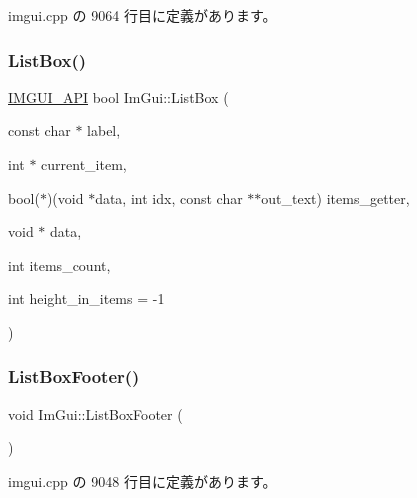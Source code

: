  imgui.\+cpp の 9064 行目に定義があります。

\mbox{\label{namespace_im_gui_ab5865b671bfa22738fac9ffd214470e2}} 
\subsubsection{\texorpdfstring{List\+Box()}{ListBox()}\hspace{0.1cm}{\footnotesize\ttfamily [2/2]}}
{\footnotesize\ttfamily \mbox{\hyperlink{imgui_8h_a43829975e84e45d1149597467a14bbf5}{I\+M\+G\+U\+I\+\_\+\+A\+PI}} bool Im\+Gui\+::\+List\+Box (\begin{DoxyParamCaption}\item[{const char $\ast$}]{label,  }\item[{int $\ast$}]{current\+\_\+item,  }\item[{bool($\ast$)(void $\ast$data, int idx, const char $\ast$$\ast$out\+\_\+text)}]{items\+\_\+getter,  }\item[{void $\ast$}]{data,  }\item[{int}]{items\+\_\+count,  }\item[{int}]{height\+\_\+in\+\_\+items = {\ttfamily -\/1} }\end{DoxyParamCaption})}

\mbox{\label{namespace_im_gui_a9a0a8f6a4a67280dce7bd91310a83a03}} 
\subsubsection{\texorpdfstring{List\+Box\+Footer()}{ListBoxFooter()}}
{\footnotesize\ttfamily void Im\+Gui\+::\+List\+Box\+Footer (\begin{DoxyParamCaption}{ }\end{DoxyParamCaption})}



 imgui.\+cpp の 9048 行目に定義があります。

\mbox{\label{namespace_im_gui_a4003d6a6ab57f2fb43db80c6339a1aed}} 
